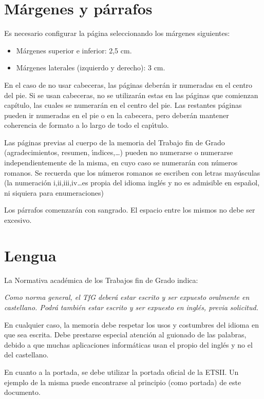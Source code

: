  

\section{Márgenes y párrafos}\label{sec:margenes}

Es necesario configurar la página seleccionando los márgenes siguientes:
\begin{itemize}
 \item Márgenes superior e inferior: 2,5 cm. 
 \item Márgenes laterales (izquierdo y derecho): 3 cm.
\end{itemize}

En el caso de no usar cabeceras, las páginas deber\'an ir numeradas en el centro del pie.
Si se usan cabeceras, no se utilizarán estas en las p\'aginas que comienzan capítulo, las cuales
se numerar\'an en el centro del pie. Las restantes p\'aginas pueden ir numeradas en el pie o en la cabecera,
pero deber\'an mantener coherencia de formato a lo largo de todo el cap{\'\i}tulo.

Las p\'aginas previas al cuerpo de la memoria del Trabajo fin de Grado (agradecimientos, resumen, {\'\i}ndices,\dots) 
pueden no numerarse o
numerarse independientemente de la misma, en cuyo caso se numerar\'an con n\'umeros romanos. 
Se recuerda que los n\'umeros romanos
se escriben con letras may\'usculas (la numeraci\'on i,ii,iii,iv\dots es propia del idioma ingl\'es 
y no es admisible en espa{\~n}ol, ni siquiera para enumeraciones)

Los p\'arrafos comenzar\'an con sangrado. El espacio entre los mismos no debe ser excesivo.

\section{Lengua}\label{sec:lengua}

La Normativa académica de los Trabajos fin de Grado indica:

\emph{Como norma general, el TfG deberá estar escrito y ser expuesto oralmente en castellano.
Podrá también estar escrito y ser expuesto en inglés, previa solicitud.}

En cualquier caso, la memoria debe respetar los usos y costumbres del idioma en que sea escrita.
Debe prestarse especial atenci\'on al guionado de las palabras, debido a que muchas aplicaciones inform\'aticas
usan el propio del ingl\'es y no el del castellano.

En cuanto a la portada, se debe utilizar la portada oficial de la ETSII. Un ejemplo de la misma puede encontrarse al 
principio (como portada) de este documento.


 
